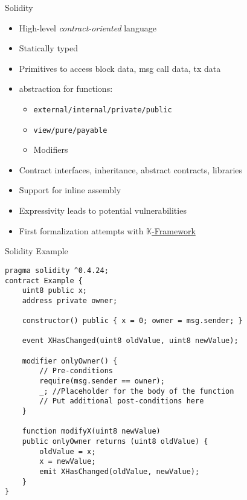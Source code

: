 \begin{frame}[fragile]{Solidity}
\begin{itemize}
\item High-level \emph{contract-oriented} language 
\item Statically typed
\item Primitives to access block data, msg call data, tx data %
\item abstraction for functions:
\begin{itemize}
\item \texttt{external/internal/private/public}
\item \texttt{view/pure/payable}
\item Modifiers
\end{itemize}
\item Contract interfaces, inheritance, abstract contracts, libraries
\item Support for inline assembly
\item Expressivity leads to potential vulnerabilities
\item First formalization attempts with \href{https://github.com/kframework/solidity-semantics}{$\mathbb{K}$-Framework}
\end{itemize}
\end{frame}

\begin{frame}[fragile]{Solidity Example}
\begin{lstlisting}[frame=single, language=Solidity]
pragma solidity ^0.4.24;
contract Example {
    uint8 public x; 
    address private owner;
    
    constructor() public { x = 0; owner = msg.sender; }
    
    event XHasChanged(uint8 oldValue, uint8 newValue);
    
    modifier onlyOwner() {
        // Pre-conditions
        require(msg.sender == owner);
        _; //Placeholder for the body of the function
        // Put additional post-conditions here
    }
    
    function modifyX(uint8 newValue) 
    public onlyOwner returns (uint8 oldValue) {
        oldValue = x;
        x = newValue;
        emit XHasChanged(oldValue, newValue);
    }
}


\end{lstlisting}

\end{frame}


